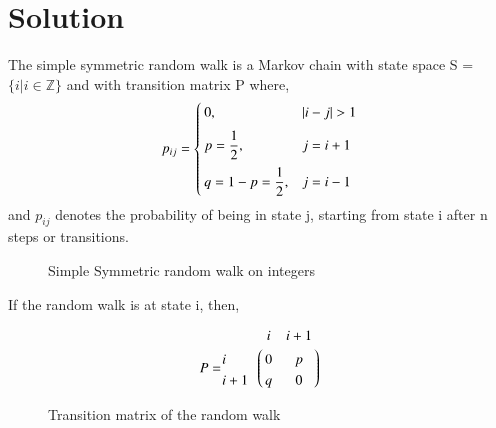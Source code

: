 \documentclass[journal,12pt,twocolumn]{IEEEtran}
\begin{document}
\section*{Solution}
The simple symmetric random walk is a Markov chain with state space S = $\{i | i \in \mathbb{Z}\}$ and with transition matrix P where, 
\begin{equation}
 p_{ij} =\begin{cases}
  0 , &|i-j|>1\vspace{0.2cm}\\
  p = \dfrac{1}{2} , &j = i+1\vspace{0.2cm}\\
  q =1-p = \dfrac{1}{2} , &j = i-1\\
  \end{cases}
\end{equation}
and $p_{ij}$ denotes the probability of being in state j, starting from state i after n steps or transitions.
\begin{figure}[H]
\centering
{}
\caption{Simple Symmetric random walk on integers}
\end{figure}
If the random walk is at state i, then,
\begin{figure}[H]
\begin{align}
P = \bordermatrix{& i & i+1  \cr
                i&  0  & p   \cr
                i+1& q & 0	 \cr
                }
\end{align}
\caption{Transition matrix of the random walk}
\end{figure}
\end{document}
